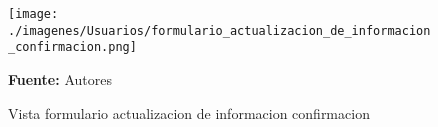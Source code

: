 \begin{figure}[!htb]
  \begin{center}
\texttt{[image: ./imagenes/Usuarios/formulario\_actualizacion\_de\_informacion\_confirmacion.png]}
    \caption{Vista formulario actualizacion de informacion confirmacion}
    \label{fig:Vista_formulario_actualizacion_de_informacion_confirmacion}
    \textbf{Fuente:}  Autores
  \end{center}
\end{figure}
